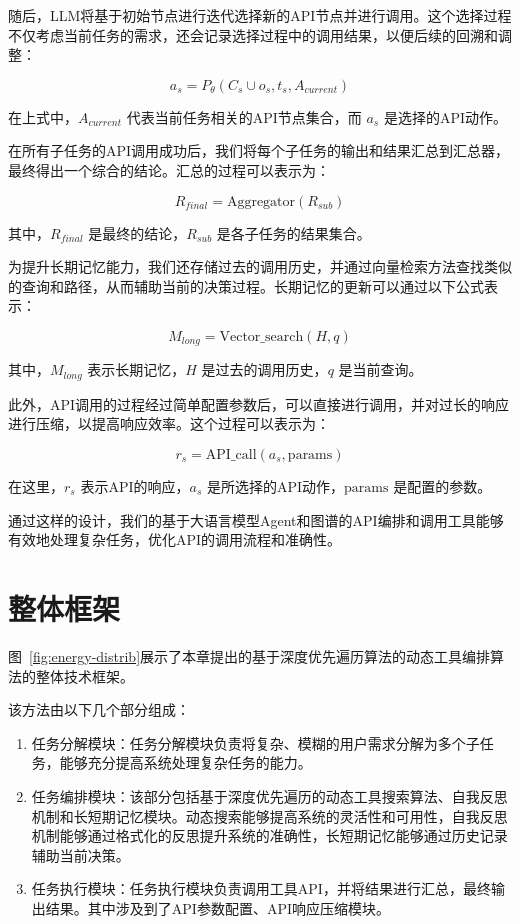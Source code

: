 随后，LLM将基于初始节点进行迭代选择新的API节点并进行调用。这个选择过程不仅考虑当前任务的需求，还会记录选择过程中的调用结果，以便后续的回溯和调整：

\[
a_s = P_\theta(C_s \cup o_s, t_s, A_{current}) \tag{3}
\]

在上式中，\( A_{current} \) 代表当前任务相关的API节点集合，而 \( a_s \) 是选择的API动作。

在所有子任务的API调用成功后，我们将每个子任务的输出和结果汇总到汇总器，最终得出一个综合的结论。汇总的过程可以表示为：

\[
R_{final} = \text{Aggregator}(R_{sub}) \tag{4}
\]

其中，\( R_{final} \) 是最终的结论，\( R_{sub} \) 是各子任务的结果集合。

为提升长期记忆能力，我们还存储过去的调用历史，并通过向量检索方法查找类似的查询和路径，从而辅助当前的决策过程。长期记忆的更新可以通过以下公式表示：

\[
M_{long} = \text{Vector\_search}(H, q) \tag{5}
\]

其中，\( M_{long} \) 表示长期记忆，\( H \) 是过去的调用历史，\( q \) 是当前查询。

此外，API调用的过程经过简单配置参数后，可以直接进行调用，并对过长的响应进行压缩，以提高响应效率。这个过程可以表示为：

\[
r_s = \text{API\_call}(a_s, \text{params}) \tag{6}
\]

在这里，\( r_s \) 表示API的响应，\( a_s \) 是所选择的API动作，\(\text{params}\) 是配置的参数。

通过这样的设计，我们的基于大语言模型Agent和图谱的API编排和调用工具能够有效地处理复杂任务，优化API的调用流程和准确性。

\section{整体框架}

图~\ref{fig:energy-distrib}展示了本章提出的基于深度优先遍历算法的动态工具编排算法的整体技术框架。

该方法由以下几个部分组成：

\begin{enumerate}
  \item 任务分解模块：任务分解模块负责将复杂、模糊的用户需求分解为多个子任务，能够充分提高系统处理复杂任务的能力。
  \item 任务编排模块：该部分包括基于深度优先遍历的动态工具搜索算法、自我反思机制和长短期记忆模块。动态搜索能够提高系统的灵活性和可用性，自我反思机制能够通过格式化的反思提升系统的准确性，长短期记忆能够通过历史记录辅助当前决策。
  \item 任务执行模块：任务执行模块负责调用工具API，并将结果进行汇总，最终输出结果。其中涉及到了API参数配置、API响应压缩模块。
\end{enumerate}

